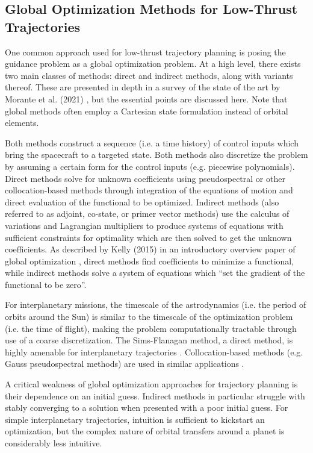 \subsection{Global Optimization Methods for Low-Thrust Trajectories}

One common approach used for low-thrust trajectory planning is posing the guidance problem as a global optimization problem. At a high level, there exists two main classes of methods: direct and indirect methods, along with variants thereof. These are presented in depth in a survey of the state of the art by Morante et al. (2021) \cite{morante2021survey}, but the essential points are discussed here. Note that global methods often employ a Cartesian state formulation instead of orbital elements.

Both methods construct a sequence (i.e. a time history) of control inputs which bring the spacecraft to a targeted state. Both methods also discretize the problem by assuming a certain form for the control inputs (e.g. piecewise polynomials). Direct methods solve for unknown coefficients using pseudospectral or other collocation-based methods through integration of the equations of motion and direct evaluation of the functional to be optimized. Indirect methods (also referred to as adjoint, co-state, or primer vector methods) use the calculus of variations and Lagrangian multipliers to produce systems of equations with sufficient constraints for optimality which are then solved to get the unknown coefficients. As described by Kelly (2015) in an introductory overview paper of global optimization \cite{kelly2015transcription}, direct methods find coefficients to minimize a functional, while indirect methods solve a system of equations which ``set the gradient of the functional to be zero''.

For interplanetary missions, the timescale of the astrodynamics (i.e. the period of orbits around the Sun) is similar to the timescale of the optimization problem (i.e. the time of flight), making the problem computationally tractable through use of a coarse discretization. The Sims-Flanagan method, a direct method, is highly amenable for interplanetary trajectories \cite{sims1997preliminary, yam2011low}. Collocation-based methods (e.g. Gauss pseudospectral methods) are used in similar applications \cite{fahroo2002direct, narayanaswamy2020comparison}.

A critical weakness of global optimization approaches for trajectory planning is their dependence on an initial guess. Indirect methods in particular struggle with stably converging to a solution when presented with a poor initial guess. For simple interplanetary trajectories, intuition is sufficient to kickstart an optimization, but the complex nature of orbital transfers around a planet is considerably less intuitive.

